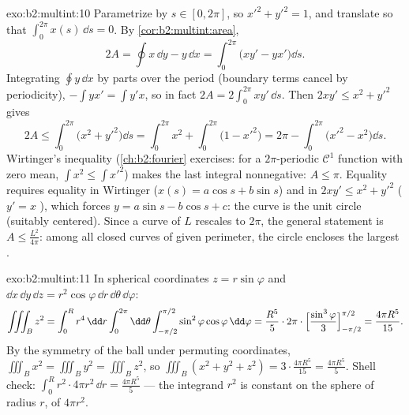 \begin{solution}{exo:b2:multint:10}
Parametrize by  $s \in [0, 2\pi]$, so $x'^2 + y'^2 = 1$,
and translate so that $\int_0^{2\pi} x(s)\,\dd s = 0$. By
\cref{cor:b2:multint:area},
\[
2A = \oint x\,\dd y - y\,\dd x
= \int_0^{2\pi}\bigl(xy' - yx'\bigr)\dd s .
\]
Integrating $\oint y\,\dd x$ by parts over the period (boundary
terms cancel by periodicity), $-\int yx' = \int y'x$, so in fact
$2A = 2\int_0^{2\pi}xy'\,\dd s$. Then $2xy' \leq x^2 + y'^2$
gives
\[
2A \leq \int_0^{2\pi}\bigl(x^2 + y'^2\bigr)\dd s
= \int_0^{2\pi} x^2 + \int_0^{2\pi}\bigl(1 - x'^2\bigr)
= 2\pi - \int_0^{2\pi}\bigl(x'^2 - x^2\bigr)\dd s .
\]
Wirtinger's inequality (\cref{ch:b2:fourier} exercises: for a
$2\pi$-periodic $\mathcal{C}^1$ function with zero mean,
$\int x^2 \leq \int x'^2$) makes the last integral nonnegative:
$A \leq \pi$. Equality requires equality in Wirtinger ($x(s) =
a\cos s + b\sin s$) and in $2xy' \leq x^2 + y'^2$ ($y' = x$
), which forces $y = a\sin s - b\cos s + c$: the curve is
the unit circle (suitably centered). Since a curve of  $L$
rescales to  $2\pi$, the general statement is $A \leq
\frac{L^2}{4\pi}$: among all closed curves of given perimeter, the
circle encloses the largest .
\end{solution}

\begin{solution}{exo:b2:multint:11}
In spherical coordinates $z = r\sin\varphi$ and $\dd x\,\dd
y\,\dd z = r^2\cos\varphi\,\dd r\,\dd\theta\,\dd\varphi$:
\[
\iiint_B z^2
= \int_0^R r^4\,\dd r\int_0^{2\pi}\dd\theta
\int_{-\pi/2}^{\pi/2}\sin^2\varphi\cos\varphi\,\dd\varphi
= \frac{R^5}5\cdot2\pi\cdot
\Bigl[\frac{\sin^3\varphi}3\Bigr]_{-\pi/2}^{\pi/2}
= \frac{4\pi R^5}{15}.
\]
By the symmetry of the ball under permuting coordinates,
$\iiint_B x^2 = \iiint_B y^2 = \iiint_B z^2$, so $\iiint_B(x^2
+ y^2 + z^2) = 3\cdot\frac{4\pi R^5}{15} = \frac{4\pi R^5}5$.
Shell check: $\int_0^R r^2\cdot 4\pi r^2\,\dd r = \frac{4\pi
R^5}5$ --- the integrand $r^2$ is constant on the sphere of
radius $r$, of  $4\pi r^2$.
\end{solution}


